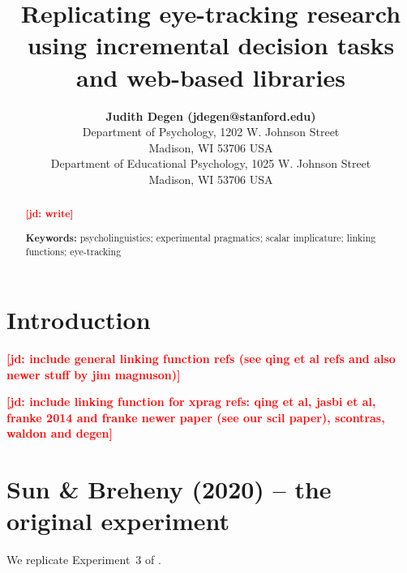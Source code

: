 \documentclass[10pt,letterpaper]{article}
\title{Replicating eye-tracking research using incremental decision tasks and web-based libraries}
\author{{\large \bf Judith Degen (jdegen@stanford.edu)} \\
  Department of Psychology, 1202 W. Johnson Street \\
  Madison, WI 53706 USA
  \AND {\large \bf Leyla Kursat (lkursat@stanford.edu)} \\
  Department of Educational Psychology, 1025 W. Johnson Street \\
  Madison, WI 53706 USA}
\newcommand{\expref}[1]{Experiment~#1}
\newcommand{\jd}[1]{\textcolor{Red}{\textbf{[jd: #1]}}}
\begin{document}
\maketitle


\begin{abstract}

\jd{write}

\textbf{Keywords:} 
psycholinguistics; experimental pragmatics;  scalar implicature; linking functions; eye-tracking
\end{abstract}


\section{Introduction}

\jd{include general linking function refs (see qing et al refs and also newer stuff by jim magnuson)}

\jd{include linking function for xprag refs: qing et al, jasbi et al, franke 2014 and franke newer paper (see our scil paper), scontras, waldon and degen}

\section{Sun \& Breheny (2020) -- the original experiment}

We replicate \expref{3} of .
\end{document}
